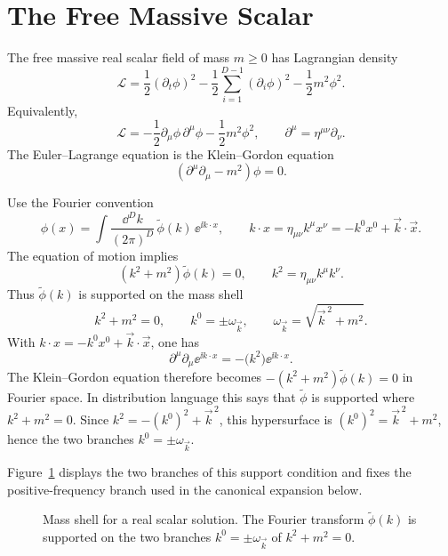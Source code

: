 \section{The Free Massive Scalar}

\begin{definition}
\label{def:free-real-klein-gordon-field}
The free massive real scalar field of mass \(m\ge0\) has Lagrangian density
\[
  \mathcal L
  =
  \frac12(\partial_t\phi)^2
  -\frac12\sum_{i=1}^{D-1}(\partial_i\phi)^2
  -\frac12m^2\phi^2.
\]
Equivalently,
\[
  \mathcal L
  =
  -\frac12\partial_\mu\phi\,\partial^\mu\phi
  -\frac12m^2\phi^2,
  \qquad
  \partial^\mu=\eta^{\mu\nu}\partial_\nu.
\]
The Euler--Lagrange equation is the Klein--Gordon equation
\[
  (\partial^\mu\partial_\mu-m^2)\phi=0.
\]
\end{definition}

Use the Fourier convention
\[
  \phi(x)
  =
  \int\frac{\dd^Dk}{(2\pi)^D}\,
  \widetilde\phi(k)\,\ee^{\ii k\cdot x},
  \qquad
  k\cdot x=\eta_{\mu\nu}k^\mu x^\nu
  =
  -k^0x^0+\vec k\cdot\vec x.
\]
The equation of motion implies
\[
  (k^2+m^2)\widetilde\phi(k)=0,
  \qquad
  k^2=\eta_{\mu\nu}k^\mu k^\nu.
\]
Thus \(\widetilde\phi(k)\) is supported on the mass shell
\[
  k^2+m^2=0,
  \qquad
  k^0=\pm\omega_{\vec k},
  \qquad
  \omega_{\vec k}=\sqrt{\vec k^{\,2}+m^2}.
\]
With \(k\cdot x=-k^0x^0+\vec k\cdot\vec x\), one has
\[
  \partial^\mu\partial_\mu \ee^{\ii k\cdot x}
  =
  -\bigl(k^2\bigr)\ee^{\ii k\cdot x}.
\]
The Klein--Gordon equation therefore becomes
\(-(k^2+m^2)\widetilde\phi(k)=0\) in Fourier space.  In distribution
language this says that \(\widetilde\phi\) is supported where
\(k^2+m^2=0\).  Since \(k^2=-(k^0)^2+\vec k^{\,2}\), this hypersurface is
\((k^0)^2=\vec k^{\,2}+m^2\), hence the two branches
\(k^0=\pm\omega_{\vec k}\).

Figure~\ref{fig:scalar-mass-shell-branches} displays the two branches of this
support condition and fixes the positive-frequency branch used in the canonical
expansion below.

\begin{figure}[H]
\centering
{}
\caption{Mass shell for a real scalar solution.  The Fourier transform
\(\widetilde\phi(k)\) is supported on the two branches
\(k^0=\pm\omega_{\vec k}\) of \(k^2+m^2=0\).}
\label{fig:scalar-mass-shell-branches}
\end{figure}


